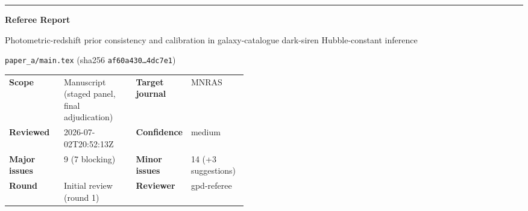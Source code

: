 \documentclass[11pt]{article}
\newcommand{\RecommendationBadge}[2]{%
  \tcbox[
    on line,
    box align=base,
    colback=#1!12,
    colframe=#1,
    arc=2pt,
    boxrule=0.8pt,
    left=7pt,
    right=7pt,
    top=4pt,
    bottom=4pt
  ]{\textbf{\textsc{#2}}}%
}
\begin{document}
{\color{ReportCrimson}\rule{\linewidth}{1.1pt}}

\begin{center}
  {\Huge\bfseries\color{ReportInk} Referee Report\par}
  \vspace{0.45em}
  {\Large Photometric-redshift prior consistency and calibration in galaxy-catalogue dark-siren Hubble-constant inference\par}
  \vspace{0.35em}
  {\normalsize \texttt{paper\_a/main.tex} (sha256 \texttt{af60a430\ldots4dc7e1})\par}
  \vspace{0.8em}
  \RecommendationBadge{ReportCrimson}{Major Revision}
\end{center}

\vspace{0.8em}

\begin{tcolorbox}[
  enhanced, colback=white, colframe=ReportLine,
  boxrule=0.7pt, arc=2pt,
  left=12pt, right=12pt, top=10pt, bottom=10pt
]
\begin{tabularx}{\linewidth}{@{}p{0.23\linewidth}Y p{0.23\linewidth}Y@{}}
\textbf{Scope} & Manuscript (staged panel, final adjudication) & \textbf{Target journal} & MNRAS \\
\textbf{Reviewed} & 2026-07-02T20:52:13Z & \textbf{Confidence} & medium \\
\textbf{Major issues} & 9 (7 blocking) & \textbf{Minor issues} & 14 (+3 suggestions) \\
\textbf{Round} & Initial review (round 1) & \textbf{Reviewer} & gpd-referee \\
\end{tabularx}
\end{tcolorbox}
\end{document}
